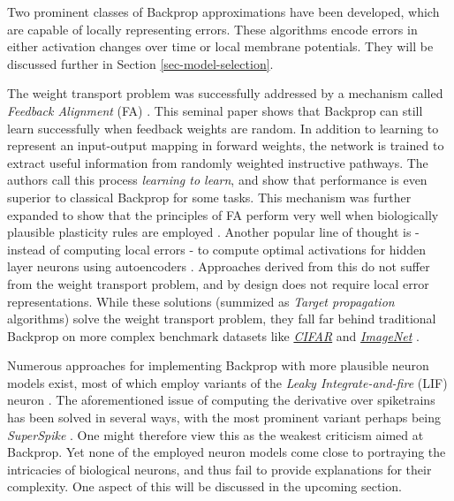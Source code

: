 Two prominent classes of Backprop approximations have been developed, which are capable of locally representing errors.
These algorithms encode errors in either activation changes over time or local membrane potentials. They will be
discussed further in Section \ref{sec-model-selection}.\newline 


\noindent The weight transport problem was successfully addressed by a mechanism called \textit{Feedback Alignment} (FA)
\citep{Lillicrap2014}. This seminal paper shows that Backprop can still learn successfully when feedback weights are
random. In addition to learning to represent an input-output mapping in forward weights, the network is trained to
extract useful information from randomly weighted instructive pathways. The authors call this process \textit{learning
to learn}, and show that performance is even superior to classical Backprop for some tasks. This mechanism was further
expanded to show that the principles of FA perform very well when biologically plausible plasticity rules are employed
\citep{Liao2016,Zenke2018}. Another popular line of thought is - instead of computing local errors - to compute optimal
activations for hidden layer neurons using autoencoders \citep{Bengio2014,Lee2015,Ahmad2020}. Approaches derived from
this do not suffer from the weight transport problem, and by design does not require local error representations. While
these solutions (summized as \textit{Target propagation} algorithms) solve the weight transport problem, they fall far
behind traditional Backprop on more complex benchmark datasets like
\textit{\href{https://www.cs.toronto.edu/~kriz/cifar.html}{CIFAR}} and
\textit{\href{https://www.image-net.org/index.php}{ImageNet}} \citep{Bartunov2018}.\newline

\noindent Numerous approaches for implementing Backprop with more plausible neuron models exist, most of which employ variants of
the \textit{Leaky Integrate-and-fire} (LIF) neuron \citep{Sporea2013,Lee2016,Bengio2017,Lee2020}. The aforementioned
issue of computing the derivative over spiketrains has been solved in several ways, with the most prominent variant
perhaps being \textit{SuperSpike} \citep{Zenke2018}. One might therefore view this as the weakest criticism aimed at
Backprop. Yet none of the employed neuron models come close to portraying the intricacies of biological neurons, and
thus fail to provide explanations for their complexity. One aspect of this will be discussed in the upcoming
section.\newline

